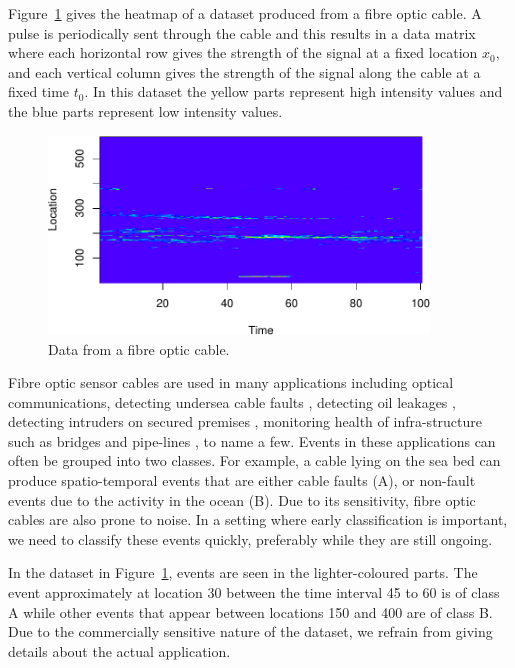 \documentclass[a4paper,11pt]{article}
\begin{document}
Figure~\ref{fig:Real_World_Data} gives the heatmap of a dataset produced from a fibre optic cable. A pulse is periodically sent through the cable and this results in a data matrix where each horizontal row gives the strength of the signal at a fixed location $x_0$, and each vertical column gives the strength of the signal along the cable at a fixed time $t_0$. In this dataset the yellow parts represent high intensity values and the blue parts represent low intensity values.

\begin{figure}
	\centering
	\includegraphics[width=0.9\textwidth]{./Graphics/Real_World.pdf} %
	\caption{Data from a fibre optic cable.}
	\label{fig:Real_World_Data}
\end{figure}

Fibre optic sensor cables are used in many applications including optical communications, detecting undersea cable faults \cite{jiang2009technological}, detecting oil leakages \cite{nikles2004leakage}, detecting intruders on secured premises \cite{griffiths1995developments}, monitoring health of infra-structure such as bridges and pipe-lines \cite{li2004recent}, to name a few. Events in these applications can often be grouped into two classes. For example, a cable lying on the sea bed can produce spatio-temporal events that are either cable faults (A), or non-fault events due to the activity in the ocean (B). Due to its sensitivity, fibre optic cables are also prone to noise. In a setting where early classification is important, we need to classify these events quickly, preferably while they are still ongoing.

In the dataset in Figure~\ref{fig:Real_World_Data}, events are seen in the lighter-coloured parts. The event approximately at location 30 between the time interval 45 to 60 is of class A while other events that appear between locations 150 and 400 are of class B. Due to the commercially sensitive nature of the dataset, we refrain from giving details about the actual application.
\end{document}
